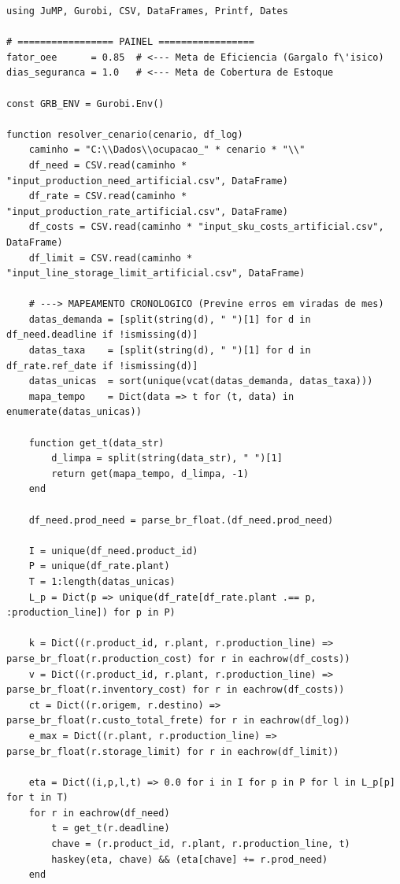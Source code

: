 \documentclass[12pt, a4paper]{article}
\begin{document}
\begin{mdframed}[style=codigo]
\begin{lstlisting}
using JuMP, Gurobi, CSV, DataFrames, Printf, Dates

# ================= PAINEL =================
fator_oee      = 0.85  # <--- Meta de Eficiencia (Gargalo f\'isico)
dias_seguranca = 1.0   # <--- Meta de Cobertura de Estoque

const GRB_ENV = Gurobi.Env()

function resolver_cenario(cenario, df_log)
    caminho = "C:\\Dados\\ocupacao_" * cenario * "\\"
    df_need = CSV.read(caminho * "input_production_need_artificial.csv", DataFrame)
    df_rate = CSV.read(caminho * "input_production_rate_artificial.csv", DataFrame)
    df_costs = CSV.read(caminho * "input_sku_costs_artificial.csv", DataFrame)
    df_limit = CSV.read(caminho * "input_line_storage_limit_artificial.csv", DataFrame)

    # ---> MAPEAMENTO CRONOLOGICO (Previne erros em viradas de mes)
    datas_demanda = [split(string(d), " ")[1] for d in df_need.deadline if !ismissing(d)]
    datas_taxa    = [split(string(d), " ")[1] for d in df_rate.ref_date if !ismissing(d)]
    datas_unicas  = sort(unique(vcat(datas_demanda, datas_taxa)))
    mapa_tempo    = Dict(data => t for (t, data) in enumerate(datas_unicas))
    
    function get_t(data_str)
        d_limpa = split(string(data_str), " ")[1]
        return get(mapa_tempo, d_limpa, -1)
    end

    df_need.prod_need = parse_br_float.(df_need.prod_need)

    I = unique(df_need.product_id)
    P = unique(df_rate.plant)
    T = 1:length(datas_unicas)
    L_p = Dict(p => unique(df_rate[df_rate.plant .== p, :production_line]) for p in P)

    k = Dict((r.product_id, r.plant, r.production_line) => parse_br_float(r.production_cost) for r in eachrow(df_costs))
    v = Dict((r.product_id, r.plant, r.production_line) => parse_br_float(r.inventory_cost) for r in eachrow(df_costs))
    ct = Dict((r.origem, r.destino) => parse_br_float(r.custo_total_frete) for r in eachrow(df_log))
    e_max = Dict((r.plant, r.production_line) => parse_br_float(r.storage_limit) for r in eachrow(df_limit))

    eta = Dict((i,p,l,t) => 0.0 for i in I for p in P for l in L_p[p] for t in T)
    for r in eachrow(df_need)
        t = get_t(r.deadline)
        chave = (r.product_id, r.plant, r.production_line, t)
        haskey(eta, chave) && (eta[chave] += r.prod_need)
    end


\end{lstlisting}
\end{mdframed}
\end{document}
